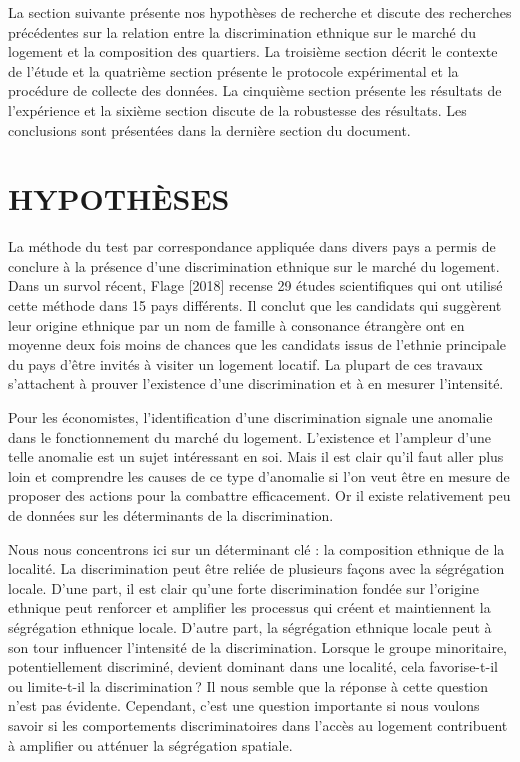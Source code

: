 \documentclass{Revue-economique} %
\begin{document}
\begin{Article}
La section suivante présente nos hypothèses de recherche et discute des recherches précédentes sur la relation entre la discrimination ethnique sur le marché du logement et la composition des quartiers. La troisième section décrit le contexte de l’étude et la quatrième section présente le protocole expérimental et la procédure de collecte des données. La cinquième section présente les résultats de l’expérience et la sixième section discute de la robustesse des résultats. Les conclusions sont présentées dans la dernière section du document.

\section{HYPOTHÈSES}

La méthode du test par correspondance appliquée dans divers pays a permis de conclure à la présence d’une discrimination ethnique sur le marché du logement. Dans un survol récent, Flage [2018] recense 29 études scientifiques qui ont utilisé cette méthode dans 15 pays différents. Il conclut que les candidats qui suggèrent leur origine ethnique par un nom de famille à consonance étrangère ont en moyenne deux fois moins de chances que les candidats issus de l’ethnie principale du pays d’être invités à visiter un logement locatif. La plupart de ces travaux s’attachent à prouver l’existence d’une discrimination et à en mesurer l’intensité.

Pour les économistes, l’identification d’une discrimination signale une anomalie dans le fonctionnement du marché du logement. L’existence et l’ampleur d’une telle anomalie est un sujet intéressant en soi. Mais il est clair qu’il faut aller plus loin et comprendre les causes de ce type d’anomalie si l’on veut être en mesure de proposer des actions pour la combattre efficacement. Or il existe relativement peu de données sur les déterminants de la discrimination.

Nous nous concentrons ici sur un déterminant clé : la composition ethnique de la localité. La discrimination peut être reliée de plusieurs façons avec la ségrégation locale. D’une part, il est clair qu’une forte discrimination fondée sur l’origine ethnique peut renforcer et amplifier les processus qui créent et maintiennent la ségrégation ethnique locale. D’autre part, la ségrégation ethnique locale peut à son tour influencer l’intensité de la discrimination. Lorsque le groupe minoritaire, potentiellement discriminé, devient dominant dans une localité, cela favorise-t-il ou limite-t-il la discrimination ? Il nous semble que la réponse à cette question n’est pas évidente. Cependant, c’est une question importante si nous voulons savoir si les comportements discriminatoires dans l’accès au logement contribuent à amplifier ou atténuer la ségrégation spatiale.


\end{Article}
\end{document}
